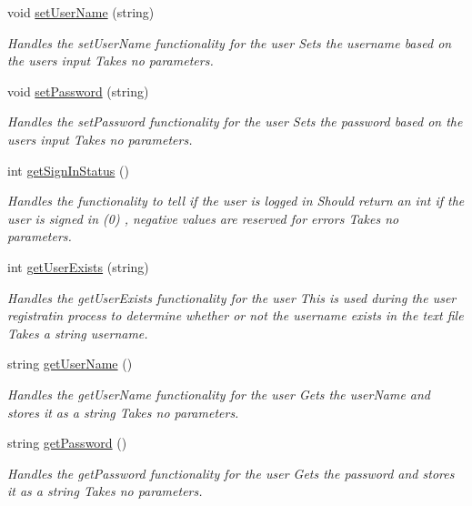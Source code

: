 \begin{DoxyCompactItemize}
void \mbox{\hyperlink{classuser_sign_in_a7128c36d84156e792b55c9df6acf1bc8}{set\+User\+Name}} (string)
\begin{DoxyCompactList}\small\item\em Handles the set\+User\+Name functionality for the user  Sets the username based on the user\textquotesingle{}s input  Takes no parameters. \end{DoxyCompactList}\item 
void \mbox{\hyperlink{classuser_sign_in_abaff4cd88aa403e831a7126abb5d63f2}{set\+Password}} (string)
\begin{DoxyCompactList}\small\item\em Handles the set\+Password functionality for the user  Sets the password based on the user\textquotesingle{}s input  Takes no parameters. \end{DoxyCompactList}\item 
int \mbox{\hyperlink{classuser_sign_in_a7d75bf1b3bb7dcaa50e4f633050b7081}{get\+Sign\+In\+Status}} ()
\begin{DoxyCompactList}\small\item\em Handles the functionality to tell if the user is logged in  Should return an int if the user is signed in (0) , negative values are reserved for errors  Takes no parameters. \end{DoxyCompactList}\item 
int \mbox{\hyperlink{classuser_sign_in_a6c80ee2fa758b708c3a1e660601d700f}{get\+User\+Exists}} (string)
\begin{DoxyCompactList}\small\item\em Handles the get\+User\+Exists functionality for the user  This is used during the user registratin process to determine whether or not the username exists in the text file  Takes a string username. \end{DoxyCompactList}\item 
string \mbox{\hyperlink{classuser_sign_in_a55ce850b1e8384f006864a8ba337b73a}{get\+User\+Name}} ()
\begin{DoxyCompactList}\small\item\em Handles the get\+User\+Name functionality for the user  Gets the user\+Name and stores it as a string  Takes no parameters. \end{DoxyCompactList}\item 
string \mbox{\hyperlink{classuser_sign_in_a993651684c3af6d06869d30d62decbbd}{get\+Password}} ()
\begin{DoxyCompactList}\small\item\em Handles the get\+Password functionality for the user  Gets the password and stores it as a string  Takes no parameters. \end{DoxyCompactList}\item 

\end{DoxyCompactItemize}
